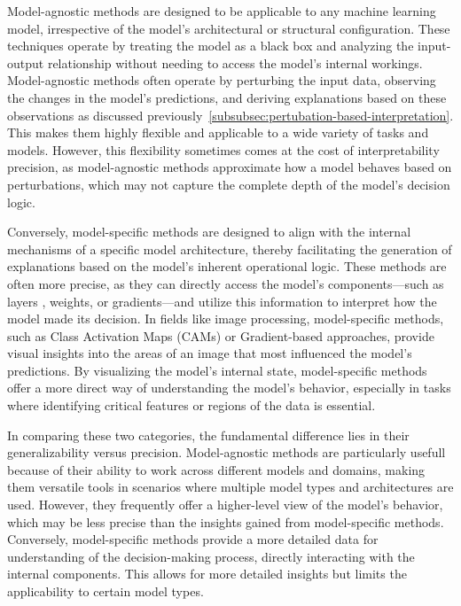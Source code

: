 Model-agnostic methods are designed to be applicable to any machine learning model, irrespective of the model's architectural
or structural configuration.
These techniques operate by treating the model as a black box and analyzing the input-output relationship without needing
to access the model's internal workings.
Model-agnostic methods often operate by perturbing the input data, observing the changes in the model’s predictions,
and deriving explanations based on these observations as discussed previously~\ref{subsubsec:pertubation-based-interpretation}.
This makes them highly flexible and applicable to a wide variety of tasks and models.
However, this flexibility sometimes comes at the cost of interpretability precision, as model-agnostic methods approximate
how a model behaves based on perturbations, which may not capture the complete depth of the model’s decision logic.

Conversely, model-specific methods are designed to align with the internal mechanisms of a specific model architecture,
thereby facilitating the generation of explanations based on the model's inherent operational logic.
These methods are often more precise, as they can directly access the model's components—such as layers ,
weights, or gradients—and utilize this information to interpret how the model made its decision.
In fields like image processing, model-specific methods, such as Class Activation Maps (CAMs) or Gradient-based approaches,
provide visual insights into the areas of an image that most influenced the model’s predictions.
By visualizing the model’s internal state, model-specific methods offer a more direct way of understanding the model’s behavior,
especially in tasks where identifying critical features or regions of the data is essential.

In comparing these two categories, the fundamental difference lies in their generalizability versus precision.
Model-agnostic methods are particularly usefull because of their ability to work across different models and domains,
making them versatile tools in scenarios where multiple model types and architectures are used.
However, they  frequently offer a higher-level view of the model’s behavior, which may be less precise than the
insights gained from model-specific methods.
Conversely, model-specific methods provide a more detailed data for understanding of the decision-making process,
directly interacting with the internal components.
This allows for more detailed insights but limits the applicability to certain model types.





